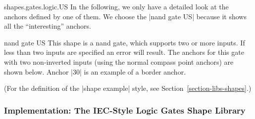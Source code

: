 \begin{pgflibrary}{shapes.gates.logic.US}
    In the following, we only have a detailed look at the anchors defined by
    one of them. We choose the |nand gate US| because it shows all the
    ``interesting'' anchors.

    \begin{shape}{nand gate US}
        This shape is a nand gate, which supports two or more inputs. If less
        than two inputs are specified an error will result. The anchors for
        this gate with two non-inverted inputs (using the normal compass point
        anchors) are shown below. Anchor |30| is an example of a border anchor.
\begin{codeexample}[]
\Huge
{}
\end{codeexample}

        (For the definition of the |shape example| style, see
        Section~\ref{section-libs-shapes}.)
    \end{shape}
\end{pgflibrary}


\subsubsection{Implementation: The IEC-Style Logic Gates Shape Library}

